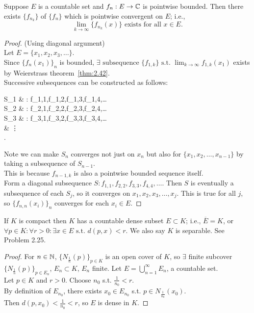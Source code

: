 \begin{thm}
	Suppose $E$ is a countable set and $f_{n}:E\to \mathbb{C}$ is pointwise bounded.
	Then there exists $\{f_{n_k}\}$ of $\{ {f}_{n}\} $ which is pointwise convergent on $E$; i.e., \[
		\lim_{k\to \infty}{\{ {f}_{n_{k}}(x)\}} \text{ exists for all } x \in E
		.\]
	\begin{proof}
		(Using diagonal argument)\\
		Let $E=\{x_1,x_2,x_3,\ldots \}$.\\
		Since $\{{f}_{n}(x_1)\}_{n}$ is bounded, $\exists{\text{ subsequence }\{f_{1,k}\}} \text{ s.t. } \lim_{k\to \infty}{f_{1,k}(x_1)}$ exists by Weierstrass theorem~\ref{thm:2.42}.\\
		Successive subsequences can be constructed as follows:\\
		\begin{flalign*}
			S_1 & : f_{1,1},f_{1,2},f_{1,3},f_{1,4},\ldots {}          \\
			S_2 & : f_{2,1},f_{2,2},f_{2,3},f_{2,4},\ldots {}     \\
			S_3 & : f_{3,1},f_{3,2},f_{3,3},f_{3,4},\ldots {} \\
			    & \vdots                                                                       \\.
		\end{flalign*}
		Note we can make $S_n$ converges not just on $x_n$ but also for $\{x_1,x_2,\ldots ,x_{n-1}\}$ by taking a subsequence of $S_{n-1}$.\\
		This is because $f_{n-1, k}$ is also a pointwise bounded sequence itself.\\
		Form a diagonal subsequence $S: f_{1,1}, f_{2,2}, f_{3,3}, f_{4,4}, \ldots $.
		Then $S$ is eventually a subsequence of each $S_j$, so it converges on $x_1,x_2,x_3,\ldots ,x_j$. This is true for all $j$, so $\{f_{n,n}(x_i)\}_n $ converges for each $x_{i} \in E$.
	\end{proof}
\end{thm}

\begin{lemma}
	If $K$ is compact then $K$ has a countable dense subset $E \subset K$; i.e., $\overline{E} = K$, or $\forall{p \in K}: \forall{r > 0}: \exists{x \in E} \text{ s.t. } d(p,x)<r$.
	We also say $K$ is separable. See Problem 2.25.
	\begin{proof}
		For $n \in \mathbb{N}$, $\{N_{\frac{1}{n}}(p)\}_{p \in K}$ is an open cover of $K$, so $\exists $ finite subcover $\{N_{\frac{1}{n}}(p)\}_{p \in E_{n}}$, $E_{n} \subset K$, $E_{n}$ finite. Let $E= \bigcup_{n=1}^{\infty} E_n$, a countable set.\\
		Let $p \in K$ and $r >0$. Choose $n_0$ s.t. $\frac{1}{n_0}<r$.\\
		By definition of $E_{n_0}$, there exists $x_0 \in E_{n_0}$ s.t. $p \in N_{\frac{1}{n_0}}(x_0)$.\\
		Then $d(p,x_0)<\frac{1}{n_0}<r$, so $E$ is dense in $K$.
	\end{proof}
\end{lemma}


